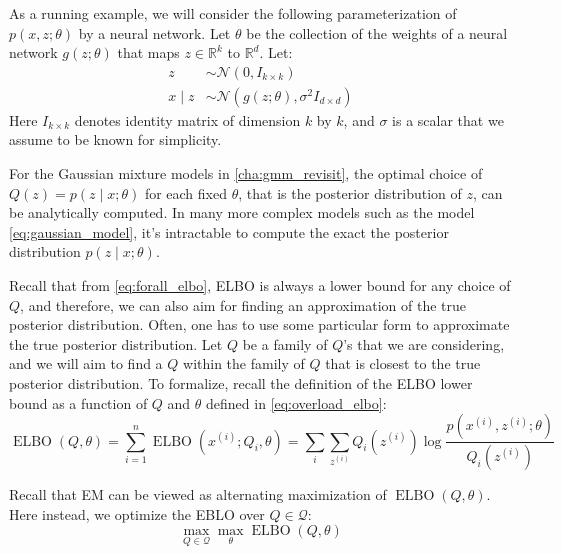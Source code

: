 As a running example, we will consider the following parameterization of
$p(x,z;\theta)$ by a neural network. Let $\theta$ be the collection of the weights of a
neural network $g(z;\theta)$ that maps $z \in \mathbb R^k$ to $\mathbb R^d$. Let:
\begin{align}
    z &\sim \mathcal N(0, I_{k \times k})\\
    x \mid z  &\sim  \mathcal N(g(z;\theta),\sigma^2 I_{d \times d})\label{eq:gaussian_model}
\end{align}
Here $I_{k \times k}$ denotes identity matrix of dimension $k$ by $k$, and $\sigma$ is a scalar that
we assume to be known for simplicity.

For the Gaussian mixture models in \cref{cha:gmm_revisit}, the optimal choice of
$Q(z) = p(z \mid x;\theta)$ for each fixed $\theta$, that is the posterior distribution of $z$,
can be analytically computed. In many more complex models such as the
model \ref{eq:gaussian_model}, it's intractable to compute the exact the posterior distribution
$p(z \mid x;\theta)$.

Recall that from \cref{eq:forall_elbo}, ELBO is always a lower bound for any
choice of $Q$, and therefore, we can also aim for finding an approximation of
the true posterior distribution. Often, one has to use some particular form
to approximate the true posterior distribution. Let $Q$ be a family of $Q$'s that
we are considering, and we will aim to find a $Q$ within the family of $Q$ that is
closest to the true posterior distribution. To formalize, recall the definition
of the ELBO lower bound as a function of $Q$ and $\theta$ defined in \cref{eq:overload_elbo}:
\begin{equation*}
    \operatorname{ELBO}(Q,\theta) = \sum_{i=1}^n \operatorname{ELBO}(x^{(i)} ;Q_i ,\theta) = \sum_i\sum_{z^{(i)}} Q_i (z^{(i)}) \log \frac{p(x^{(i)} ,z^{(i)} ;\theta)}{Q_i (z^{(i)})}    
\end{equation*}

Recall that EM can be viewed as alternating maximization of $\operatorname{ELBO}(Q,\theta)$.
Here instead, we optimize the EBLO over $Q \in \mathcal Q$:
\begin{equation}
    \max_{Q\in \mathcal Q} \max_\theta \operatorname{ELBO}(Q,\theta)\label{eq:max_q_in_q}
\end{equation}

